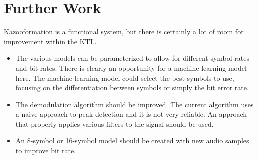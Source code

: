 \documentclass[]{article}
\begin{document}
\section{Further Work}


Kazooformation is a functional system, but there is certainly a lot of room for improvement within the KTL.

\begin{itemize}
  \item The various models can be parameterized to allow for different symbol rates and bit rates. There is clearly an opportunity for a machine learning model here. The machine learning model could select the best symbols to use, focusing on the differentiation between symbols or simply the bit error rate.

  \item The demodulation algorithm should be improved. The current algorithm uses a naive approach to peak detection and it is not very reliable. An approach that properly applies various filters to the signal should be used.

  \item An 8-symbol or 16-symbol model should be created with new audio samples to improve bit rate.
\end{itemize}







\end{document}
